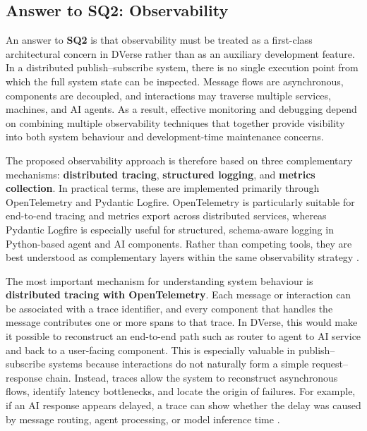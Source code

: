 \documentclass[11pt]{article}
\begin{document}
\subsection{Answer to SQ2: Observability}

An answer to \textbf{SQ2} is that observability must be treated as a first-class architectural concern in DVerse rather than as an auxiliary development feature. In a distributed publish--subscribe system, there is no single execution point from which the full system state can be inspected. Message flows are asynchronous, components are decoupled, and interactions may traverse multiple services, machines, and AI agents. As a result, effective monitoring and debugging depend on combining multiple observability techniques that together provide visibility into both system behaviour and development-time maintenance concerns.

The proposed observability approach is therefore based on three complementary mechanisms: \textbf{distributed tracing}, \textbf{structured logging}, and \textbf{metrics collection}. In practical terms, these are implemented primarily through OpenTelemetry and Pydantic Logfire. OpenTelemetry is particularly suitable for end-to-end tracing and metrics export across distributed services, whereas Pydantic Logfire is especially useful for structured, schema-aware logging in Python-based agent and AI components. Rather than competing tools, they are best understood as complementary layers within the same observability strategy \cite{opentelemetryDocs,logfireConcepts}.

The most important mechanism for understanding system behaviour is \textbf{distributed tracing with OpenTelemetry}. Each message or interaction can be associated with a trace identifier, and every component that handles the message contributes one or more spans to that trace. In DVerse, this would make it possible to reconstruct an end-to-end path such as router to agent to AI service and back to a user-facing component. This is especially valuable in publish--subscribe systems because interactions do not naturally form a simple request--response chain. Instead, traces allow the system to reconstruct asynchronous flows, identify latency bottlenecks, and locate the origin of failures. For example, if an AI response appears delayed, a trace can show whether the delay was caused by message routing, agent processing, or model inference time \cite{opentelemetryDocs,opentelemetrySpec}.
\end{document}
